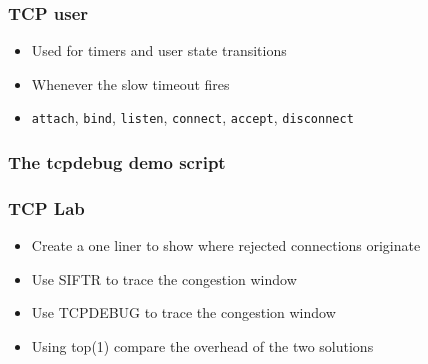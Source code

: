 \documentclass[pdftex]{beamer}
\begin{document}
\begin{frame}[fragile]
  \frametitle{TCP user}
  \begin{itemize}
  \item Used for timers and user state transitions
  \item Whenever the slow timeout fires
  \item \verb|attach|, \verb|bind|, \verb|listen|, \verb|connect|,
    \verb|accept|, \verb|disconnect|
  \end{itemize}
\end{frame}

\begin{frame}
  \frametitle{The tcpdebug demo script}
\end{frame}

\begin{frame}
  \frametitle{TCP Lab}
  \begin{itemize}
  \item Create a one liner to show where rejected connections
    originate
  \item Use SIFTR to trace the congestion window
  \item Use TCPDEBUG to trace the congestion window
  \item Using top(1) compare the overhead of the two solutions
  \end{itemize}
\end{frame}
\end{document}
